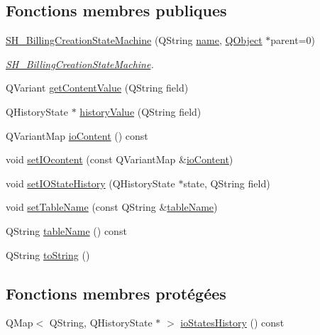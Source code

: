 \subsection*{Fonctions membres publiques}
\begin{DoxyCompactItemize}
\item 
\hyperlink{classSH__BillingCreationStateMachine_ad62b77fa4aeafe200056ff3974562f83}{S\-H\-\_\-\-Billing\-Creation\-State\-Machine} (Q\-String \hyperlink{classSH__NamedObject_a970f265df31b28b2179bbbceb6170ac2}{name}, \hyperlink{classQObject}{Q\-Object} $\ast$parent=0)
\begin{DoxyCompactList}\small\item\em \hyperlink{classSH__BillingCreationStateMachine}{S\-H\-\_\-\-Billing\-Creation\-State\-Machine}. \end{DoxyCompactList}\item 
Q\-Variant \hyperlink{classSH__InOutStateMachine_a2cdd914f1e597ac52d021106eec75c89}{get\-Content\-Value} (Q\-String field)
\item 
Q\-History\-State $\ast$ \hyperlink{classSH__InOutStateMachine_a84fb2b2c2105cae9c590c0d15960854a}{history\-Value} (Q\-String field)
\item 
Q\-Variant\-Map \hyperlink{classSH__InOutStateMachine_a79b456cb2e353cb61ef9fe19c97fc8fb}{io\-Content} () const 
\item 
void \hyperlink{classSH__InOutStateMachine_a23a925522339132a51d16a7cff9074b9}{set\-I\-Ocontent} (const Q\-Variant\-Map \&\hyperlink{classSH__InOutStateMachine_a79b456cb2e353cb61ef9fe19c97fc8fb}{io\-Content})
\item 
void \hyperlink{classSH__InOutStateMachine_a4b72e6da839782a211692a4d728c3925}{set\-I\-O\-State\-History} (Q\-History\-State $\ast$state, Q\-String field)
\item 
void \hyperlink{classSH__InOutStateMachine_a437a730d07ddd15bd96314ab0b6cf40e}{set\-Table\-Name} (const Q\-String \&\hyperlink{classSH__InOutStateMachine_a18b07a985695100612bbcbda870933b4}{table\-Name})
\item 
Q\-String \hyperlink{classSH__InOutStateMachine_a18b07a985695100612bbcbda870933b4}{table\-Name} () const 
\item 
Q\-String \hyperlink{classSH__InOutStateMachine_a60ecd7de03d948e2d1e9cbedb5c3e5fa}{to\-String} ()
\end{DoxyCompactItemize}
\subsection*{Fonctions membres protégées}
\begin{DoxyCompactItemize}
\item 
Q\-Map$<$ Q\-String, Q\-History\-State $\ast$ $>$ \hyperlink{classSH__InOutStateMachine_a4ec3ebb4c40ea57c63afdf5976e62a94}{io\-States\-History} () const 
\end{DoxyCompactItemize}
